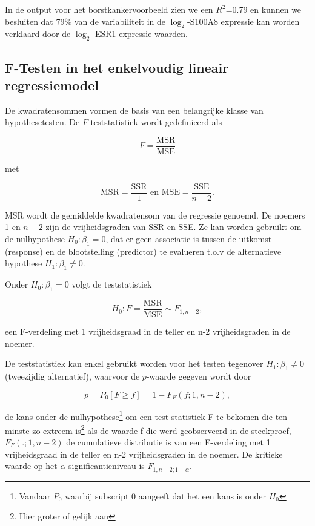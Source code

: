 \documentclass[
  12pt,dutch,coursenotes]{book}
\theoremstyle{definition}
\theoremstyle{definition}
\theoremstyle{definition}
\theoremstyle{definition}
\theoremstyle{remark}
\begin{document}
In de output voor het borstkankervoorbeeld zien we een \(R^2\)=0.79 en kunnen we besluiten dat 79\% van de variabiliteit in de \(\log_2\)-S100A8 expressie kan worden verklaard door de \(\log_2\)-ESR1 expressie-waarden.

\hypertarget{f-testen-in-het-enkelvoudig-lineair-regressiemodel}{%
\subsection{F-Testen in het enkelvoudig lineair regressiemodel}\label{f-testen-in-het-enkelvoudig-lineair-regressiemodel}}

De kwadratensommen vormen de basis van een belangrijke klasse van hypothesetesten.
De \(F\)-teststatistiek wordt gedefinieerd als

\[  F  = \frac{\text{MSR}}{\text{MSE}}\]

met

\[\text{MSR} = \frac{\text{SSR}}{1} \text{ en } \text{MSE} = \frac{\text{SSE}}{n-2}.\]

MSR wordt de gemiddelde kwadratensom van de regressie genoemd. De noemers 1 en \(n-2\) zijn de vrijheidsgraden van SSR en SSE.
Ze kan worden gebruikt om de nulhypothese \(H_0: \beta_1=0\), dat er geen associatie is tussen de uitkomst (response) en de blootstelling (predictor) te evalueren t.o.v de alternatieve hypothese \(H_1: \beta_1\neq0\).

Onder \(H_0: \beta_1=0\) volgt de teststatistiek

\[H_0:F = \frac{\text{MSR}}{\text{MSE}} \sim F_{1,n-2},\]

een F-verdeling met 1 vrijheidsgraad in de teller en n-2 vrijheidsgraden in de noemer.

De teststatistiek kan enkel gebruikt worden voor het testen tegenover \(H_1:\beta_1\neq 0\) (tweezijdig alternatief), waarvoor de \(p\)-waarde gegeven wordt door

\[  p = P_0\left[F\geq f\right]=1-F_F(f;1,n-2),\]

de kans onder de nulhypothese\footnote{Vandaar \(P_0\) waarbij subscript 0 aangeeft dat het een kans is onder \(H_0\)} om een test statistiek F te bekomen die ten minste zo extreem is\footnote{Hier groter of gelijk aan} als de waarde f die werd geobserveerd in de steekproef, \(F_F(.;1,n-2)\) de cumulatieve distributie is van een F-verdeling met 1 vrijheidsgraad in de teller en n-2 vrijheidsgraden in de noemer. De kritieke waarde op het \(\alpha\) significantieniveau is \(F_{1,n-2;1-\alpha}\).
\end{document}
